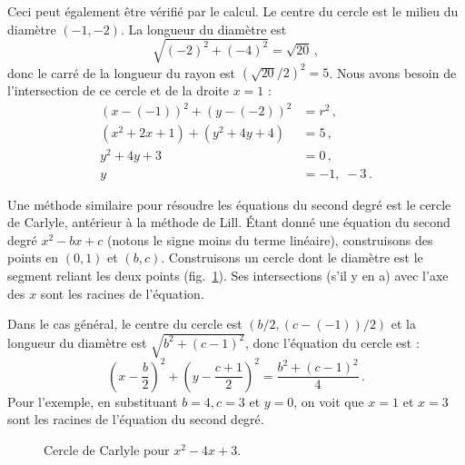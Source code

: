 Ceci peut également être vérifié par le calcul. Le centre du cercle est le milieu du diamètre $(-1,-2)$. La longueur du diamètre est 
\[
\sqrt{(-2)^2+(-4)^2}=\sqrt{20}\,,
\]
donc le carré de la longueur du rayon est $\left(\sqrt{20}/2\right)^2=5$. Nous avons besoin de l'intersection de ce cercle et de la droite $x=1$ :
\begin{align*}
(x-(-1))^2+(y-(-2))^2&=r^2\,,\\
(x^2+2x+1)+(y^2+4y+4)&=5\,,\\
y^2+4y+3&=0\,,\\
y&=-1,\;-3\,.
\end{align*}


Une méthode similaire pour résoudre les équations du second degré est le cercle de Carlyle, antérieur à la méthode de Lill. Étant donné une équation du second degré $x^2-bx+c$ (notons le signe moins du terme linéaire), construisons des points en $(0,1)$ et $(b,c)$. Construisons un cercle dont le diamètre est le segment reliant les deux points (fig.~\ref{f.carlyle-circle}). Ses intersections (s'il y en a) avec l'axe des $x$ sont les racines de l'équation.

Dans le cas général, le centre du cercle est $(b/2,(c-(-1))/2)$ et la longueur du diamètre est $\sqrt{b^2+(c-1)^2}$, donc l'équation du cercle est :
\[
\left(x-\frac{b}{2}\right)^2+\left(y-\frac{c+1}{2}\right)^2=
\frac{b^2+(c-1)^2}{4}\,.
\]
Pour l'exemple, en substituant $b=4,c=3$ et $y=0$, on voit que $x=1$ et $x=3$ sont les racines de l'équation du second degré.


\begin{figure}[htbp]
\centering
{}
\caption{Cercle de Carlyle pour $x^2-4x+3$.}\label{f.carlyle-circle}
\end{figure}


